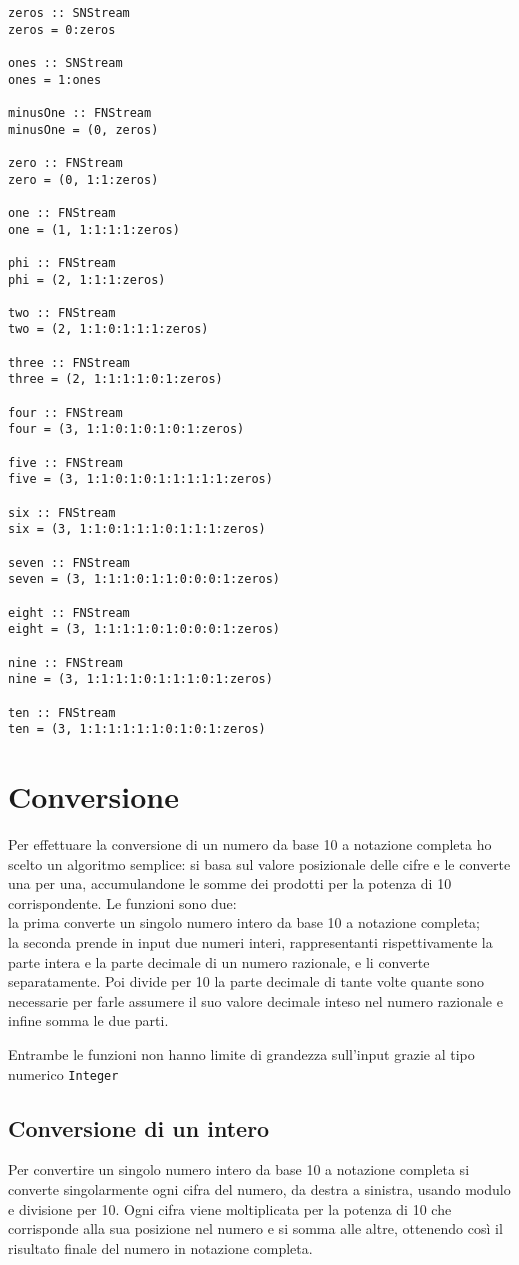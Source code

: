 \documentclass[Lau]{sapthesis}
\newcommand{\code}[1]{\colorbox{light-gray}{\texttt{#1}}}
\begin{document}
\begin{verbatim}
zeros :: SNStream
zeros = 0:zeros

ones :: SNStream
ones = 1:ones

minusOne :: FNStream
minusOne = (0, zeros)

zero :: FNStream
zero = (0, 1:1:zeros)

one :: FNStream
one = (1, 1:1:1:1:zeros)

phi :: FNStream
phi = (2, 1:1:1:zeros)

two :: FNStream
two = (2, 1:1:0:1:1:1:zeros)

three :: FNStream
three = (2, 1:1:1:1:0:1:zeros)

four :: FNStream
four = (3, 1:1:0:1:0:1:0:1:zeros)

five :: FNStream
five = (3, 1:1:0:1:0:1:1:1:1:1:zeros)

six :: FNStream
six = (3, 1:1:0:1:1:1:0:1:1:1:zeros)

seven :: FNStream
seven = (3, 1:1:1:0:1:1:0:0:0:1:zeros)

eight :: FNStream
eight = (3, 1:1:1:1:0:1:0:0:0:1:zeros)

nine :: FNStream
nine = (3, 1:1:1:1:0:1:1:1:0:1:zeros)

ten :: FNStream
ten = (3, 1:1:1:1:1:1:0:1:0:1:zeros)
\end{verbatim}


\section{Conversione}
Per effettuare la conversione di un numero da base 10 a notazione completa ho scelto un algoritmo semplice: si basa sul valore posizionale delle cifre e le converte una per una, accumulandone le somme dei prodotti per la potenza di 10 corrispondente. Le funzioni sono due:\\
la prima converte un singolo numero intero da base 10 a notazione completa;\\
la seconda prende in input due numeri interi, rappresentanti rispettivamente la parte intera e la parte decimale di un numero razionale, e li converte separatamente. Poi divide per 10 la parte decimale di tante volte quante sono necessarie per farle assumere il suo valore decimale inteso nel numero razionale e infine somma le due parti.

Entrambe le funzioni non hanno limite di grandezza sull'input grazie al tipo numerico \code{Integer}


\subsection{Conversione di un intero}
Per convertire un singolo numero intero da base 10 a notazione completa si converte singolarmente ogni cifra del numero, da destra a sinistra, usando modulo e divisione per 10. Ogni cifra viene moltiplicata per la potenza di 10 che corrisponde alla sua posizione nel numero e si somma alle altre, ottenendo così il risultato finale del numero in notazione completa.
\end{document}
